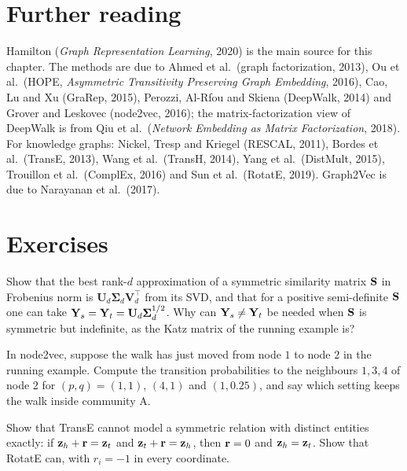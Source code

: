 \begin{notechapter}
\section*{Further reading}
Hamilton (\emph{Graph Representation Learning}, 2020) is the main source for this chapter. The methods are due to Ahmed et al.\ (graph factorization, 2013), Ou et al.\ (HOPE, \emph{Asymmetric Transitivity Preserving Graph Embedding}, 2016), Cao, Lu and Xu (GraRep, 2015), Perozzi, Al-Rfou and Skiena (DeepWalk, 2014) and Grover and Leskovec (node2vec, 2016); the matrix-factorization view of DeepWalk is from Qiu et al.\ (\emph{Network Embedding as Matrix Factorization}, 2018). For knowledge graphs: Nickel, Tresp and Kriegel (RESCAL, 2011), Bordes et al.\ (TransE, 2013), Wang et al.\ (TransH, 2014), Yang et al.\ (DistMult, 2015), Trouillon et al.\ (ComplEx, 2016) and Sun et al.\ (RotatE, 2019). Graph2Vec is due to Narayanan et al.\ (2017).

\section*{Exercises}

\begin{exercise}\label{shallow-embeddings:exr:1}
Show that the best rank-$d$ approximation of a symmetric similarity matrix $\mathbf{S}$ in Frobenius norm is $\mathbf U_d\mathbf\Sigma_d\mathbf V_d^\top$ from its SVD, and that for a positive semi-definite $\mathbf{S}$ one can take $\mathbf{Y}_s = \mathbf{Y}_t = \mathbf U_d\mathbf\Sigma_d^{1/2}$. Why can $\mathbf{Y}_s \ne \mathbf{Y}_t$ be needed when $\mathbf{S}$ is symmetric but indefinite, as the Katz matrix of the running example is?
\end{exercise}

\begin{exercise}\label{shallow-embeddings:exr:2}
In node2vec, suppose the walk has just moved from node $1$ to node $2$ in the running example. Compute the transition probabilities to the neighbours $1, 3, 4$ of node $2$ for $(p, q) = (1, 1)$, $(4, 1)$ and $(1, 0.25)$, and say which setting keeps the walk inside community A.
\end{exercise}

\begin{exercise}\label{shallow-embeddings:exr:3}
Show that TransE cannot model a symmetric relation with distinct entities exactly: if $\mathbf{z}_h + \mathbf{r} = \mathbf{z}_t$ and $\mathbf{z}_t + \mathbf{r} = \mathbf{z}_h$, then $\mathbf{r} = 0$ and $\mathbf{z}_h = \mathbf{z}_t$. Show that RotatE can, with $r_i = -1$ in every coordinate.
\end{exercise}


\end{notechapter}
